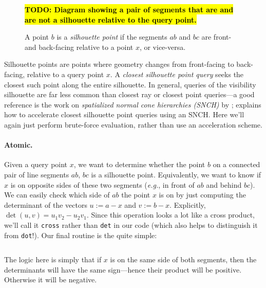 \documentclass{article}
\newcommand{\code}[1]{\texttt{\small{#1}}}
\newcommand{\todo}[1]{\textbf{\hl{TODO: #1}}}
\newcommand{\eg}{\emph{e.g.}} %
\renewcommand{\vec}[1]{#1}
\begin{document}
\begin{figure}[h!]
   \todo{Diagram showing a pair of segments that are and are not a silhouette relative to the query point.}
   \caption{A point \(\vec{b}\) is a \emph{silhouette point} if the segments \(\vec{a}\vec{b}\) and \(\vec{b}\vec{c}\) are front- and back-facing relative to a point \(\vec{x}\), or vice-versa.}
\end{figure}

Silhouette points are points where geometry changes from front-facing to back-facing, relative to a query point \(\vec{x}\).  A \emph{closest silhouette point query} seeks the closest such point along the entire silhouette.  In general, queries of the visibility silhouette are far less common than closest ray or closest point queries---a good reference is the work on \emph{spatialized normal cone hierarchies (SNCH)} by \citet{johnson2001spatialized}; \citet[Section 5.1]{Sawhney:2023:WoSt} explains how to accelerate closest silhouette point queries using an SNCH.  Here we'll again just perform brute-force evaluation, rather than use an acceleration scheme.

\paragraph{Atomic.} Given a query point \(\vec{x}\), we want to determine whether the point \(\vec{b}\) on a connected pair of line segments \(\vec{a}\vec{b}\), \(\vec{b}\vec{c}\) is a silhouette point.  Equivalently, we want to know if \(\vec{x}\) is on opposite sides of these two segments (\eg{}, in front of \(\vec{a}\vec{b}\) and behind \(\vec{b}\vec{c}\)).  We can easily check which side of \(\vec{a}\vec{b}\) the point \(\vec{x}\) is on by just computing the determinant of the vectors \(\vec{u} := \vec{a}-\vec{x}\) and \(\vec{v} := \vec{b}-\vec{x}\).  Explicitly, \(\det(\vec{u},\vec{v}) = \vec{u}_1 \vec{v}_2 - \vec{u}_2 \vec{v}_1\).  Since this operation looks a lot like a cross product, we'll call it \code{cross} rather than \code{det} in our code (which also helps to distinguish it from \code{dot}!).  Our final routine is the quite simple:

\inputminted[fontsize=\small,linenos,firstline=43,lastline=46,bgcolor=bg]{cpp}{../code/WoStLaplace2D.cpp}

The logic here is simply that if \(\vec{x}\) is on the same side of both segments, then the determinants will have the same sign---hence their product will be positive.  Otherwise it will be negative.
\end{document}
